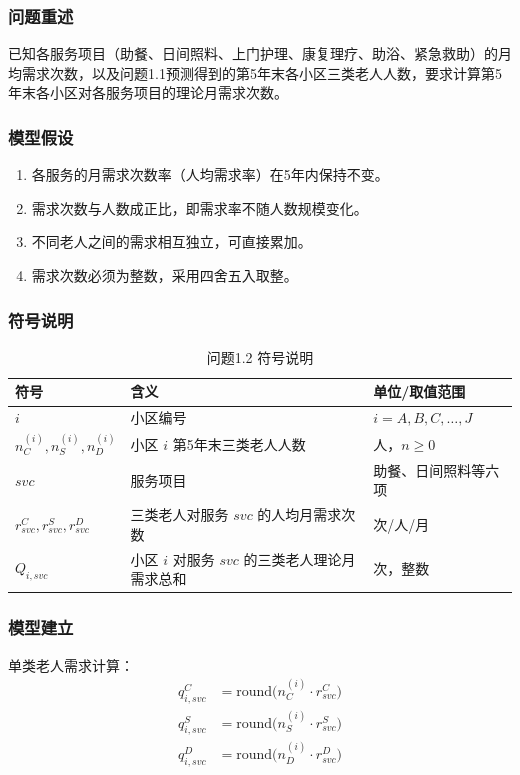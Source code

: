 \documentclass[12pt,a4paper]{article}
\begin{document}
\subsubsection{问题重述}
已知各服务项目（助餐、日间照料、上门护理、康复理疗、助浴、紧急救助）的月均需求次数，以及问题1.1预测得到的第5年末各小区三类老人人数，要求计算第5年末各小区对各服务项目的理论月需求次数。

\subsubsection{模型假设}
\begin{enumerate}
    \item 各服务的月需求次数率（人均需求率）在5年内保持不变。
    \item 需求次数与人数成正比，即需求率不随人数规模变化。
    \item 不同老人之间的需求相互独立，可直接累加。
    \item 需求次数必须为整数，采用四舍五入取整。
\end{enumerate}

\subsubsection{符号说明}
\begin{table}[htbp]
\centering
\caption{问题1.2 符号说明}
\label{tab:symbols_1.2}
\begin{tabular}{@{} l p{4.5cm} p{3.5cm} @{}}
\toprule
符号 & 含义 & 单位/取值范围 \\
\midrule
$i$ & 小区编号 & $i = A, B, C, \ldots, J$ \\
$n_C^{(i)}, n_S^{(i)}, n_D^{(i)}$ & 小区 $i$ 第5年末三类老人人数 & 人，$n \geq 0$ \\
$svc$ & 服务项目 & 助餐、日间照料等六项 \\
$r_{svc}^C, r_{svc}^S, r_{svc}^D$ & 三类老人对服务 $svc$ 的人均月需求次数 & 次/人/月 \\
$Q_{i,svc}$ & 小区 $i$ 对服务 $svc$ 的三类老人理论月需求总和 & 次，整数 \\
\bottomrule
\end{tabular}
\end{table}

\subsubsection{模型建立}
单类老人需求计算：
\begin{align}
q_{i,svc}^C &= \text{round}\bigl(n_C^{(i)} \cdot r_{svc}^C\bigr) \tag{2.1} \\
q_{i,svc}^S &= \text{round}\bigl(n_S^{(i)} \cdot r_{svc}^S\bigr) \tag{2.2} \\
q_{i,svc}^D &= \text{round}\bigl(n_D^{(i)} \cdot r_{svc}^D\bigr) \tag{2.3}
\end{align}
\end{document}
